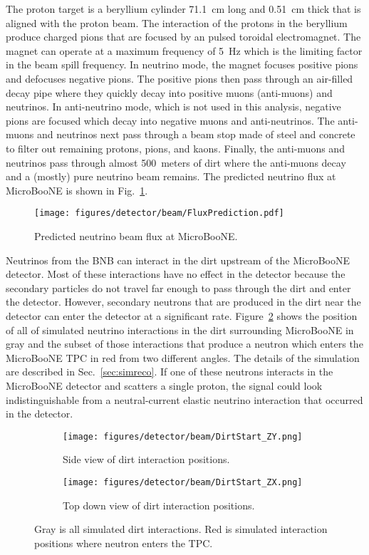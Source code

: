   The proton target is a beryllium cylinder 71.1~cm long and 0.51~cm thick
  that is aligned with the proton beam. The interaction of the protons in the
  beryllium produce charged pions that are focused by an pulsed toroidal
  electromagnet. The magnet can operate at a maximum frequency of 5~Hz which
  is the limiting factor in the beam spill frequency. In neutrino mode, the
  magnet focuses positive pions and defocuses negative pions. The positive
  pions then pass through an air-filled decay pipe where they quickly decay
  into positive muons (anti-muons) and neutrinos. In anti-neutrino mode,
  which is not used in this analysis, negative pions are focused which decay
  into negative muons and anti-neutrinos. The anti-muons and neutrinos next
  pass through a beam stop made of steel and concrete to filter out remaining
  protons, pions, and kaons. Finally, the anti-muons and neutrinos pass
  through almost 500~meters of dirt where the anti-muons decay and a (mostly)
  pure neutrino beam remains. The predicted neutrino flux at MicroBooNE is
  shown in Fig.~\ref{fig:beamflux}.

  \begin{figure}[h]
    \centering
    \texttt{[image: figures/detector/beam/FluxPrediction.pdf]}
    \caption{Predicted neutrino beam flux at MicroBooNE.}
    \label{fig:beamflux}
  \end{figure}

  Neutrinos from the BNB can interact in the dirt upstream of the MicroBooNE
  detector. Most of these interactions have no effect in the detector because
  the secondary particles do not travel far enough to pass through the dirt
  and enter the detector. However, secondary neutrons that are produced in
  the dirt near the detector can enter the detector at a significant rate.
  Figure~\ref{fig:dirtstart} shows the position of all of simulated neutrino
  interactions in the dirt surrounding MicroBooNE in gray and the subset of
  those interactions that produce a neutron which enters the MicroBooNE TPC
  in red from two different angles. The details of the simulation are
  described in Sec.~\ref{sec:simreco}. If one of these neutrons interacts in
  the MicroBooNE detector and scatters a single proton, the signal could look
  indistinguishable from a neutral-current elastic neutrino interaction that
  occurred in the detector.

  \begin{figure}[h]
    \centering
    \begin{subfigure}{2.5in}
      \texttt{[image: figures/detector/beam/DirtStart\_ZY.png]}
      \caption{Side view of dirt interaction positions.}
    \end{subfigure}
    \hspace{2pt}
    \begin{subfigure}{2.5in}
      \texttt{[image: figures/detector/beam/DirtStart\_ZX.png]}
      \caption{Top down view of dirt interaction positions.}
    \end{subfigure}
    \caption{Gray is all simulated dirt interactions. Red is simulated
    interaction positions where neutron enters the TPC.}
    \label{fig:dirtstart}
  \end{figure}

